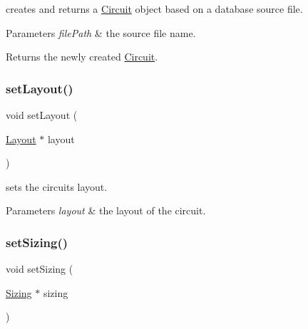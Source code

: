 creates and returns a \hyperlink{class_open_chams_1_1_circuit}{Circuit} object based on a database source file. 


\begin{DoxyParams}{Parameters}
{\em file\+Path} & the source file name.\\
\hline
\end{DoxyParams}
\begin{DoxyReturn}{Returns}
the newly created \hyperlink{class_open_chams_1_1_circuit}{Circuit}. 
\end{DoxyReturn}
\mbox{\label{class_open_chams_1_1_circuit_a4babcbc5b9f7797cc0befb675d5f538c}} 
\subsubsection{\texorpdfstring{set\+Layout()}{setLayout()}}
{\footnotesize\ttfamily void set\+Layout (\begin{DoxyParamCaption}\item[{\hyperlink{class_open_chams_1_1_layout}{Layout} $\ast$}]{layout }\end{DoxyParamCaption})\hspace{0.3cm}{\ttfamily [inline]}}



sets the circuit\textquotesingle{}s layout. 


\begin{DoxyParams}{Parameters}
{\em layout} & the layout of the circuit. \\
\hline
\end{DoxyParams}
\mbox{\label{class_open_chams_1_1_circuit_ab065572c5c1d9beb304324f2d2d8b525}} 
\subsubsection{\texorpdfstring{set\+Sizing()}{setSizing()}}
{\footnotesize\ttfamily void set\+Sizing (\begin{DoxyParamCaption}\item[{\hyperlink{class_open_chams_1_1_sizing}{Sizing} $\ast$}]{sizing }\end{DoxyParamCaption})\hspace{0.3cm}{\ttfamily [inline]}}



